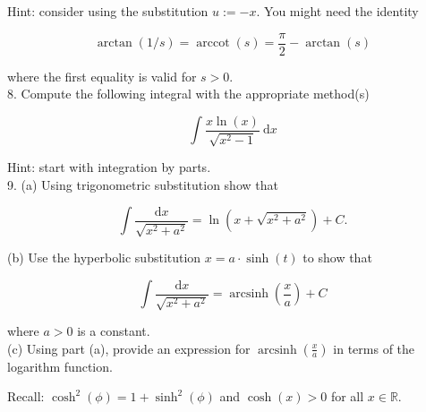 \documentclass[10pt]{article}
\begin{document}
Hint: consider using the substitution $u:=-x$. You might need the identity

$$
\arctan (1 / s)=\operatorname{arccot}(s)=\frac{\pi}{2}-\arctan (s)
$$

where the first equality is valid for $s>0$.\\
8. Compute the following integral with the appropriate method(s)

$$
\int \frac{x \ln (x)}{\sqrt{x^{2}-1}} \mathrm{~d} x
$$

Hint: start with integration by parts.\\
9. (a) Using trigonometric substitution show that

$$
\int \frac{\mathrm{d} x}{\sqrt{x^{2}+a^{2}}}=\ln \left(x+\sqrt{x^{2}+a^{2}}\right)+C .
$$

(b) Use the hyperbolic substitution $x=a \cdot \sinh (t)$ to show that

$$
\int \frac{\mathrm{d} x}{\sqrt{x^{2}+a^{2}}}=\operatorname{arcsinh}\left(\frac{x}{a}\right)+C
$$

where $a>0$ is a constant.\\
(c) Using part (a), provide an expression for $\operatorname{arcsinh}\left(\frac{x}{a}\right)$ in terms of the logarithm function.

Recall: $\cosh ^{2}(\phi)=1+\sinh ^{2}(\phi)$ and $\cosh (x)>0$ for all $x \in \mathbb{R}$.
\end{document}
